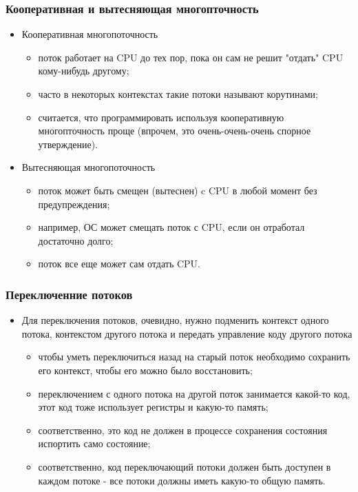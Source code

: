 \begin{frame}
\frametitle{Кооперативная и вытесняющая многопточность}
\begin{itemize}
  \item Кооперативная многопоточность
  \begin{itemize}
    \item поток работает на CPU до тех пор, пока он сам не решит "отдать" CPU
    кому-нибудь другому;
    \item часто в некоторых контекстах такие потоки называют корутинами;
    \item считается, что программировать используя кооперативную многопточность
    проще (впрочем, это очень-очень-очень спорное утверждение).
  \end{itemize}
  \item Вытесняющая многопоточность
  \begin{itemize}
    \item поток может быть смещен (вытеснен) c CPU в любой момент без
    предупреждения;
    \item например, ОС может смещать поток с CPU, если он отработал достаточно
    долго;
    \item поток все еще может сам отдать CPU.
  \end{itemize}
\end{itemize}
\end{frame}

\begin{frame}
\frametitle{Переключенние потоков}
\begin{itemize}
  \item Для переключения потоков, очевидно, нужно подменить контекст одного
  потока, контекстом другого потока и передать управление коду другого потока
  \begin{itemize}
    \item чтобы уметь переключиться назад на старый поток необходимо сохранить
    его контекст, чтобы его можно было восстановить;
    \item переключением с одного потока на другой поток занимается какой-то
    код, этот код тоже использует регистры и какую-то память;
    \item соответственно, это код не должен в процессе сохранения состояния
    испортить само состояние;
    \item соответственно, код переключающий потоки должен быть доступен в каждом
    потоке - все потоки должны иметь какую-то общую память.
  \end{itemize}
\end{itemize}
\end{frame}

